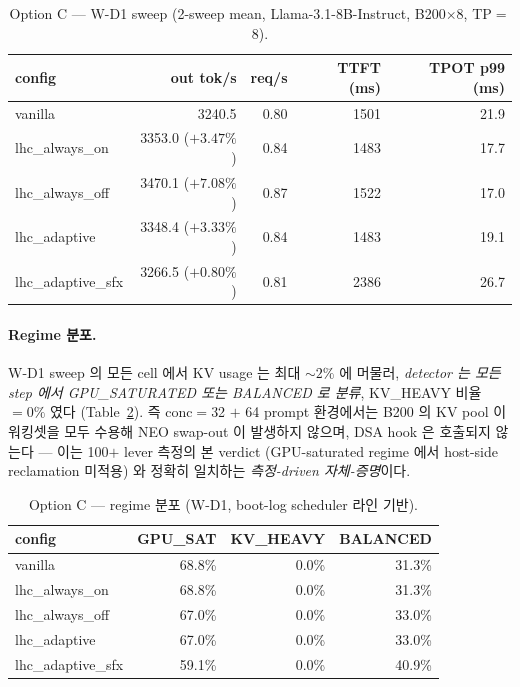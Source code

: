 \begin{table}[t]
\centering
\small
\caption{Option C — W-D1 sweep (2-sweep mean, Llama-3.1-8B-Instruct,
B200$\times$8, TP$=$8).}
\label{tbl:optionC-wd1}
\begin{tabular}{lrrrr}
\toprule
config & out tok/s & req/s & TTFT (ms) & TPOT p99 (ms) \\
\midrule
vanilla            & 3240.5 & 0.80 & 1501 & 21.9 \\
lhc\_always\_on    & 3353.0 \tiny($+3.47\%$) & 0.84 & 1483 & 17.7 \\
lhc\_always\_off   & 3470.1 \tiny($+7.08\%$) & 0.87 & 1522 & 17.0 \\
lhc\_adaptive      & 3348.4 \tiny($+3.33\%$) & 0.84 & 1483 & 19.1 \\
lhc\_adaptive\_sfx & 3266.5 \tiny($+0.80\%$) & 0.81 & 2386 & 26.7 \\
\bottomrule
\end{tabular}
\end{table}

\paragraph{Regime 분포.}
W-D1 sweep 의 모든 cell 에서 KV usage 는 최대 $\sim\!2\%$ 에 머물러,
\emph{detector 는 모든 step 에서 GPU\_SATURATED 또는 BALANCED 로 분류},
KV\_HEAVY 비율 $=0\%$ 였다 (Table~\ref{tbl:optionC-regime}).
즉 conc$=$32 $+$ 64 prompt 환경에서는 B200 의 KV pool 이 워킹셋을
모두 수용해 NEO swap-out 이 발생하지 않으며, DSA hook 은 호출되지
않는다 — 이는 100$+$ lever 측정의 본 verdict (GPU-saturated regime
에서 host-side reclamation 미적용) 와 정확히 일치하는 \emph{측정-driven 자체-증명}이다.

\begin{table}[t]
\centering
\small
\caption{Option C — regime 분포 (W-D1, boot-log scheduler 라인 기반).}
\label{tbl:optionC-regime}
\begin{tabular}{lrrr}
\toprule
config & GPU\_SAT & KV\_HEAVY & BALANCED \\
\midrule
vanilla            & 68.8\% & 0.0\% & 31.3\% \\
lhc\_always\_on    & 68.8\% & 0.0\% & 31.3\% \\
lhc\_always\_off   & 67.0\% & 0.0\% & 33.0\% \\
lhc\_adaptive      & 67.0\% & 0.0\% & 33.0\% \\
lhc\_adaptive\_sfx & 59.1\% & 0.0\% & 40.9\% \\
\bottomrule
\end{tabular}
\end{table}

